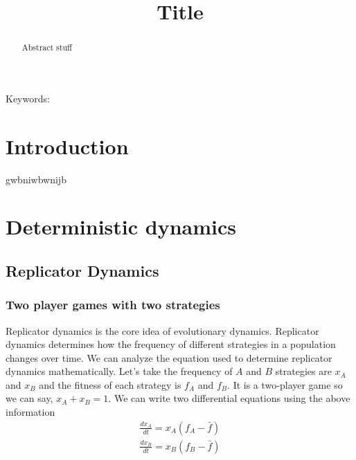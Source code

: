 \documentclass{article}
\title{\vspace*{-22mm}\bf Title}
\date{}
\begin{document}
\linenumbers
\maketitle

\begin{abstract}
Abstract stuff
\end{abstract}


\noindent
Keywords: 


\tableofcontents

\section{Introduction}
gwbniwbwnijb


%

\section{Deterministic dynamics}
\subsection{Replicator Dynamics}

\subsubsection{Two player games with two strategies}

Replicator dynamics is the core idea of evolutionary dynamics. Replicator dynamics determines how the frequency of different strategies in a population changes over time.
We can analyze the equation used to determine replicator dynamics mathematically.
Let's take the frequency of $A$ and $B$ strategies are $x_A$ and $x_B$ and the fitness of each strategy is $f_A$ and $f_B$. It is a two-player game so we can say, $ x_A+x_B=1 $. We can write two differential equations using the above information
\begin{align}
\frac{dx_A}{dt} = x_A(f_A - \bar{f}) \nonumber \\
\frac{dx_B}{dt} = x_B(f_B - \bar{f}) \label{eq:1}
\end{align}
\end{document}
